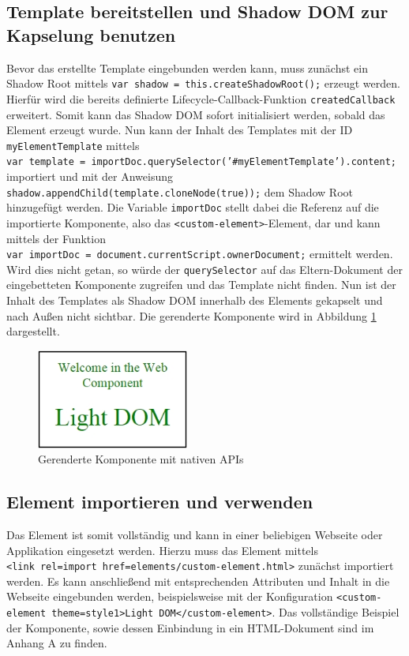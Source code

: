 \subsection{Template bereitstellen und Shadow DOM zur Kapselung benutzen}\label{template-bereitstellen-und-shadow-dom-zur-kapselung-benutzen}

Bevor das erstellte Template eingebunden werden kann, muss zunächst ein Shadow Root mittels \texttt{var\ shadow\ =\ this.createShadowRoot();} erzeugt werden. Hierfür wird die bereits definierte Lifecycle-Callback-Funktion \texttt{createdCallback} erweitert. Somit kann das Shadow \ac{DOM} sofort initialisiert werden, sobald das Element erzeugt wurde. Nun kann der Inhalt des Templates mit der ID \texttt{myElementTemplate} mittels \texttt{var\ template\ =\ importDoc.querySelector('\#myElementTemplate').content;} importiert und mit der Anweisung \texttt{shadow.appendChild(template.cloneNode(true));} dem Shadow Root hinzugefügt werden. Die Variable \texttt{importDoc} stellt dabei die Referenz auf die importierte Komponente, also das \texttt{\textless{}custom-element\textgreater{}}-Element, dar und kann mittels der Funktion \texttt{var\ importDoc\ =\ document.currentScript.ownerDocument;} ermittelt werden. Wird dies nicht getan, so würde der \texttt{querySelector} auf das Eltern-Dokument der eingebetteten Komponente zugreifen und das Template nicht finden. Nun ist der Inhalt des Templates als Shadow \ac{DOM} innerhalb des Elements gekapselt und nach Außen nicht sichtbar. Die gerenderte Komponente wird in Abbildung \ref{fig:gwkmnapis} dargestellt.

\begin{figure}[htbp]
 \centering
 \includegraphics[width=5cm,keepaspectratio]{kapitel2/bilder/7-beispiel}
 \caption{Gerenderte Komponente mit nativen APIs}
 \label{fig:gwkmnapis}
\end{figure}


\subsection{Element importieren und verwenden}\label{element-importieren-und-verwenden}

Das Element ist somit vollständig und kann in einer beliebigen Webseite oder Applikation eingesetzt werden. Hierzu muss das Element mittels \texttt{\textless{}link\ rel=\dq import\dq\ href=\dq elements/custom-element.html\dq\textgreater{}} zunächst importiert werden. Es kann anschließend mit entsprechenden Attributen und Inhalt in die Webseite eingebunden werden, beispielsweise mit der Konfiguration \texttt{\textless{}custom-element\ theme=\dq style1\dq\textgreater{}Light DOM\textless{}/custom-element\textgreater{}}. Das vollständige Beispiel der Komponente, sowie dessen Einbindung in ein \ac{HTML}-Dokument sind im Anhang A zu finden.
